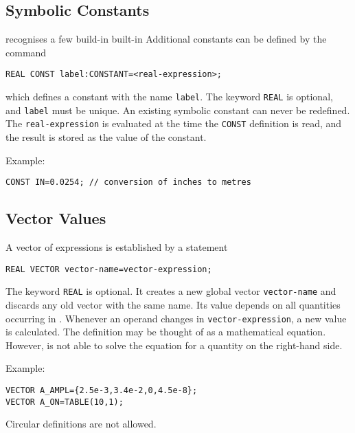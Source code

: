 \subsection{Symbolic Constants}
\label{sec:constant}
\opal recognises a few build-in built-in  
Additional constants can be defined by the command
\begin{verbatim}
REAL CONST label:CONSTANT=<real-expression>;
\end{verbatim}
which defines a constant with the name \texttt{label}.
The keyword \texttt{REAL} is optional, and \texttt{label} must be unique.
An existing symbolic constant can never be redefined.
The \texttt{real-expression} is evaluated at the time the
\texttt{CONST} definition is read, and the result is stored as the
value of the constant.

\noindent Example:
\begin{verbatim}
CONST IN=0.0254; // conversion of inches to metres
\end{verbatim}

\subsection{Vector Values}
\label{sec:vector}
A vector of expressions is established by a statement
\begin{verbatim}
REAL VECTOR vector-name=vector-expression;
\end{verbatim}
The keyword \texttt{REAL} is optional.
It creates a new global vector \texttt{vector-name}
and discards any old vector with the same name.
Its value depends on all quantities occurring in 
.
Whenever an operand changes in \texttt{vector-expression},
a new value is calculated.
The definition may be thought of as a mathematical equation.
However, \opal is not able to solve the equation for a quantity on the
right-hand side.

\noindent Example:
\begin{verbatim}
VECTOR A_AMPL={2.5e-3,3.4e-2,0,4.5e-8};
VECTOR A_ON=TABLE(10,1);
\end{verbatim}
Circular definitions are not allowed.

